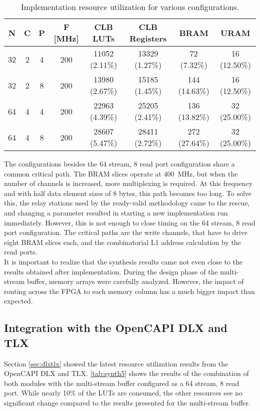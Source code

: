 \begin{table}[H]
  \centering
  \caption{Implementation resource utilization for various configurations.}
  \label{tab:synth4}
  \begin{tabular}{ c | c | c || c || c | c | c | c }
    \textbf{N} & \textbf{C} & \textbf{P} & \textbf{F [MHz]} & \textbf{CLB LUTs} & \textbf{CLB Registers} & \textbf{BRAM} & \textbf{URAM} \\ \hline \hline
    32 & 2 & 4 & 200 & 11052 (2.11\%) & 13329 (1.27\%) & 72 (7.32\%) & 16 (12.50\%) \\
    32 & 2 & 8 & 200 & 13980 (2.67\%) & 15185 (1.45\%) & 144 (14.63\%) & 16 (12.50\%) \\
    64 & 4 & 4 & 200 & 22963 (4.39\%) & 25205 (2.41\%) & 136 (13.82\%) & 32 (25.00\%) \\
    64 & 4 & 8 & 200 & 28607 (5.47\%) & 28411 (2.72\%) & 272 (27.64\%) & 32 (25.00\%) \\
  \end{tabular}
\end{table}

The configurations besides the 64 stream, 8 read port configuration share a common critical path. The BRAM slices operate at \SI{400}{\mega\hertz}, but when the number of channels is increased, more multiplexing is required. At this frequency and with half data element sizes of 8 bytes, this path becomes too long. To solve this, the relay stations used by the ready-valid methodology came to the rescue, and changing a parameter resulted in starting a new implementation run immediately. However, this is not enough to close timing on the 64 stream, 8 read port configuration. The critical paths are the write channels, that have to drive eight BRAM slices each, and the combinatorial L1 address calculation by the read ports.\\
It is important to realize that the synthesis results came not even close to the results obtained after implementation. During the design phase of the multi-stream buffer, memory arrays were carefully analyzed. However, the impact of routing across the FPGA to each memory column has a much bigger impact than expected.

\subsection{Integration with the OpenCAPI DLX and TLX}
Section \ref{sec:dlxtlx} showed the latest resource utilization results from the OpenCAPI DLX and TLX. \autoref{tab:synth5} shows the results of the combination of both modules with the multi-stream buffer configured as a 64 stream, 8 read port. While nearly 10\% of the LUTs are consumed, the other resources see no significant change compared to the results presented for the multi-stream buffer.

